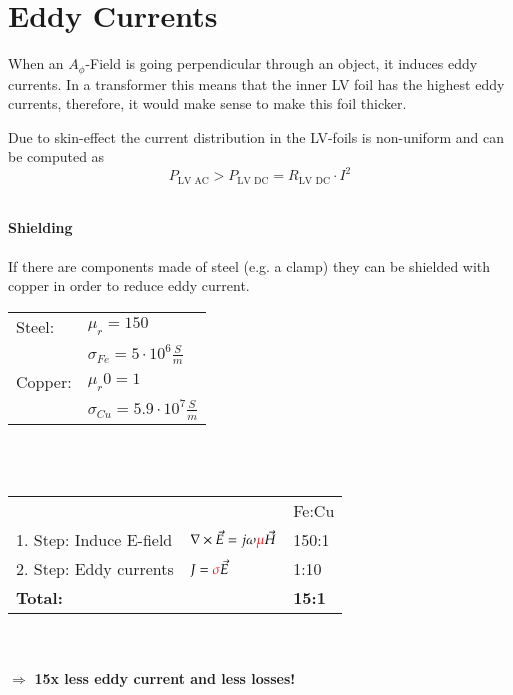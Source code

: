 \section{Eddy Currents}
When an $A_\phi$-Field is going perpendicular through an object, it induces eddy currents. In a transformer this means that the inner LV foil has the highest eddy currents, therefore, it would make sense to make this foil thicker. \newline

Due to skin-effect the current distribution in the LV-foils is non-uniform and can be computed as
\begin{equation*}
	P_\textrm{LV AC} > P_\textrm{LV DC} = R_\textrm{LV DC} \cdot I^2
\end{equation*}

\textbf{\\Shielding \\ \\} 
If there are components made of steel (e.g. a clamp) they can be shielded with copper in order to reduce eddy current. \newline 
\begin{tabular}{ll}
	Steel: 	& \(\displaystyle \mu_r = 150\) \\
			& \(\displaystyle \sigma_{Fe} = 5 \cdot 10^6 \frac{S}{m} \) \\
	Copper: & \(\displaystyle \mu_r 0= 1 \) \\
			& \(\displaystyle \sigma_{Cu} = 5.9 \cdot 10^7 \frac{S}{m} \) \\
\end{tabular} \\ \\
\begin{tabular}{lll}
	 & & Fe:Cu \\
	1. Step: Induce E-field & \(\displaystyle \nabla \times \vec{E} = j\omega\color{red}\mu\color{black}\vec{H} \) & 150:1 \\
	2. Step: Eddy currents  & \(\displaystyle J = \color{red}\sigma\color{black}\vec{E} \) & 1:10 \\
	\textbf{Total:} & & \textbf{15:1}
\end{tabular}\\ \\
$\Rightarrow$ \textbf{15x less eddy current and less losses!}